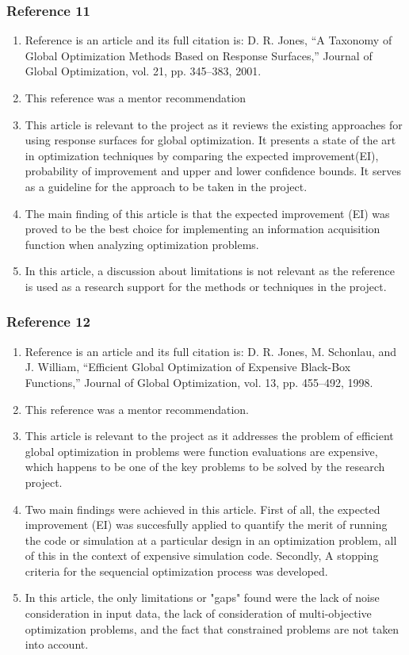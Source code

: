 \documentclass{journal}
\begin{document}
\subsubsection{Reference 11}
\begin{enumerate}
	\item Reference \cite{Jones2001} is an article and its full citation is: D. R. Jones, “A Taxonomy of Global Optimization Methods Based on Response Surfaces,” Journal of Global Optimization, vol. 21, pp. 345–383, 2001.
	\item This reference was a mentor recommendation
	\item This article is relevant to the project as it reviews the existing approaches for using response surfaces for global optimization. It presents a state of the art in optimization techniques by comparing the expected improvement(EI), probability of improvement and upper and lower confidence bounds. It serves as a guideline for the approach to be taken in the project.
	\item The main finding of this article is that the expected improvement (EI) was proved to be the best choice for implementing an information acquisition function when analyzing optimization problems.
	\item In this article, a discussion about limitations is not relevant as the reference is used as a research support for the methods or techniques in the project.
\end{enumerate}

\subsubsection{Reference 12}
\begin{enumerate}
	\item Reference \cite{Jones1998} is an article and its full citation is:  D. R. Jones, M. Schonlau, and J. William, “Efficient Global Optimization of Expensive Black-Box Functions,” Journal of Global Optimization, vol. 13, pp. 455–492, 1998.
	\item This reference was a mentor recommendation.
	\item This article is relevant to the project as it addresses the problem of efficient global optimization in problems were function evaluations are expensive, which happens to be one of the key problems to be solved by the research project.
	\item Two main findings were achieved in this article. First of all, the expected improvement (EI) was succesfully applied to quantify the merit of running the code or simulation at a particular design in an optimization problem, all of this in the context of expensive simulation code. Secondly, A stopping criteria for the sequencial optimization process was developed.
	\item In this article, the only limitations or "gaps" found were the lack of noise consideration in input data, the lack of consideration of multi-objective optimization problems, and the fact that constrained problems are not taken into account.
\end{enumerate}
\end{document}
